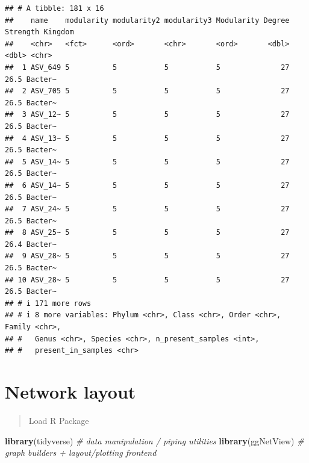 \documentclass[
]{book}
\newenvironment{Shaded}{\begin{snugshade}}{\end{snugshade}}
\newcommand{\CommentTok}[1]{\textcolor[rgb]{0.56,0.35,0.01}{\textit{#1}}}
\newcommand{\FunctionTok}[1]{\textcolor[rgb]{0.13,0.29,0.53}{\textbf{#1}}}
\newcommand{\NormalTok}[1]{#1}
\newcommand{\SpecialCharTok}[1]{\textcolor[rgb]{0.81,0.36,0.00}{\textbf{#1}}}
\newcommand{\StringTok}[1]{\textcolor[rgb]{0.31,0.60,0.02}{#1}}
\begin{document}
\begin{Shaded}
\end{Shaded}

\begin{verbatim}
## # A tibble: 181 x 16
##    name    modularity modularity2 modularity3 Modularity Degree Strength Kingdom
##    <chr>   <fct>      <ord>       <chr>       <ord>       <dbl>    <dbl> <chr>  
##  1 ASV_649 5          5           5           5              27     26.5 Bacter~
##  2 ASV_705 5          5           5           5              27     26.5 Bacter~
##  3 ASV_12~ 5          5           5           5              27     26.5 Bacter~
##  4 ASV_13~ 5          5           5           5              27     26.5 Bacter~
##  5 ASV_14~ 5          5           5           5              27     26.5 Bacter~
##  6 ASV_14~ 5          5           5           5              27     26.5 Bacter~
##  7 ASV_24~ 5          5           5           5              27     26.5 Bacter~
##  8 ASV_25~ 5          5           5           5              27     26.4 Bacter~
##  9 ASV_28~ 5          5           5           5              27     26.5 Bacter~
## 10 ASV_28~ 5          5           5           5              27     26.5 Bacter~
## # i 171 more rows
## # i 8 more variables: Phylum <chr>, Class <chr>, Order <chr>, Family <chr>,
## #   Genus <chr>, Species <chr>, n_present_samples <int>,
## #   present_in_samples <chr>
\end{verbatim}

\chapter{Network layout}\label{network-layout}

\begin{quote}
Load R Package
\end{quote}

\begin{Shaded}
\begin{Highlighting}[]
\FunctionTok{library}\NormalTok{(tidyverse)   }\CommentTok{\# data manipulation / piping utilities}
\FunctionTok{library}\NormalTok{(ggNetView)   }\CommentTok{\# graph builders + layout/plotting frontend}
\end{Highlighting}
\end{Shaded}
\end{document}
